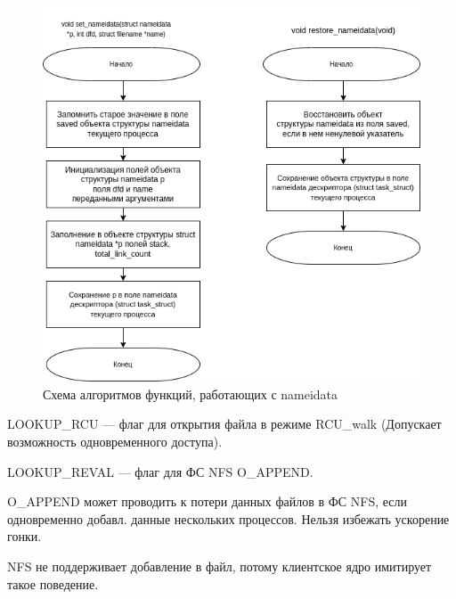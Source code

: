 \begin{figure}[H]
	\centering
	\includegraphics[scale=0.8]{assets/open-set_nameidata.drawio.png}
	\caption{Схема алгоритмов функций, работающих с nameidata}
\end{figure}

LOOKUP\_RCU --- флаг для открытия файла в режиме RCU\_walk (Допускает
возможность одновременного доступа).

LOOKUP\_REVAL --- флаг для ФС NFS O\_APPEND.

O\_APPEND может проводить к потери данных файлов в ФС NFS,
если одновременно добавл. данные нескольких процессов.
Нельзя избежать ускорение гонки.

NFS не поддерживает добавление в файл, потому клиентское ядро имитирует такое поведение.

